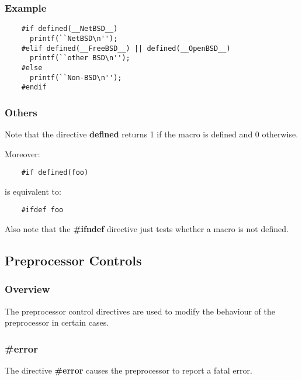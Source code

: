{%

\begin{frame}[containsverbatim]
  \frametitle{Example}

  \begin{verbatim}
    #if defined(__NetBSD__)
      printf(``NetBSD\n'');
    #elif defined(__FreeBSD__) || defined(__OpenBSD__)
      printf(``other BSD\n'');
    #else
      printf(``Non-BSD\n'');
    #endif
  \end{verbatim}
\end{frame}


\begin{frame}[containsverbatim]
  \frametitle{Others}

  Note that the directive \textbf{defined} returns 1 if the macro is
  defined and 0 otherwise.

  \nl

  Moreover:

  \begin{verbatim}
    #if defined(foo)
  \end{verbatim}

  is equivalent to:

  \begin{verbatim}
    #ifdef foo
  \end{verbatim}

  Also note that the \textbf{\#ifndef} directive just tests whether a macro
  is not defined.
\end{frame}

%
%

\subsection{Preprocessor Controls}


\begin{frame}
  \frametitle{Overview}

  The preprocessor control directives are used to modify the behaviour
  of the preprocessor in certain cases.
\end{frame}


\begin{frame}[containsverbatim]
  \frametitle{\textbf{\#error}}

  The directive \textbf{\#error} causes the preprocessor to report a
  fatal error.

  \nl


\end{frame}}
